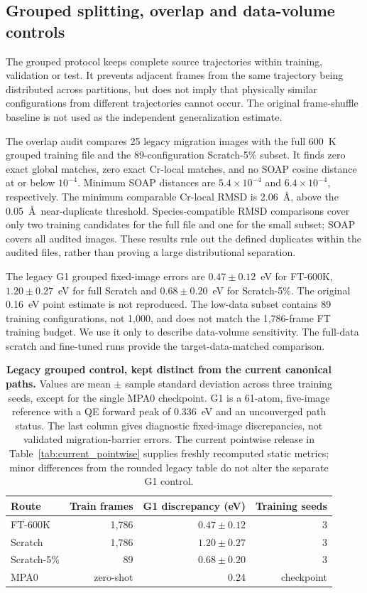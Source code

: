 \documentclass[pdflatex,sn-mathphys-num]{sn-jnl}
\begin{document}
\subsection{Grouped splitting, overlap and data-volume controls}\label{sec:overlap}
The grouped protocol keeps complete source trajectories within training, validation or test. It prevents adjacent frames from the same trajectory being distributed across partitions, but does not imply that physically similar configurations from different trajectories cannot occur. The original frame-shuffle baseline is not used as the independent generalization estimate.

The overlap audit compares 25 legacy migration images with the full 600~K grouped training file and the 89-configuration Scratch-5\% subset. It finds zero exact global matches, zero exact Cr-local matches, and no SOAP cosine distance at or below $10^{-4}$. Minimum SOAP distances are $5.4\times10^{-4}$ and $6.4\times10^{-4}$, respectively. The minimum comparable Cr-local RMSD is 2.06~\AA, above the 0.05~\AA\ near-duplicate threshold. Species-compatible RMSD comparisons cover only two training candidates for the full file and one for the small subset; SOAP covers all audited images. These results rule out the defined duplicates within the audited files, rather than proving a large distributional separation.

The legacy G1 grouped fixed-image errors are $0.47\pm0.12$~eV for FT-600K, $1.20\pm0.27$~eV for full Scratch and $0.68\pm0.20$~eV for Scratch-5\%. The original 0.16~eV point estimate is not reproduced. The low-data subset contains 89 training configurations, not 1,000, and does not match the 1,786-frame FT training budget. We use it only to describe data-volume sensitivity. The full-data scratch and fine-tuned runs provide the target-data-matched comparison.

\begin{table}[htbp]
\centering\small
\caption{\textbf{Legacy grouped control, kept distinct from the current canonical paths.} Values are mean $\pm$ sample standard deviation across three training seeds, except for the single MPA0 checkpoint. G1 is a 61-atom, five-image reference with a QE forward peak of 0.336~eV and an unconverged path status. The last column gives diagnostic fixed-image discrepancies, not validated migration-barrier errors. The current pointwise release in Table~\ref{tab:current_pointwise} supplies freshly recomputed static metrics; minor differences from the rounded legacy table do not alter the separate G1 control.}
\label{tab:a2_grouped_audit_summary}
\begin{tabular}{lrrr}
\toprule
Route & Train frames & G1 discrepancy (eV) & Training seeds\\
\midrule
FT-600K & 1,786 & $0.47\pm0.12$ & 3\\
Scratch & 1,786 & $1.20\pm0.27$ & 3\\
Scratch-5\% & 89 & $0.68\pm0.20$ & 3\\
MPA0 & zero-shot & 0.24 & checkpoint\\
\bottomrule
\end{tabular}
\end{table}
\end{document}
